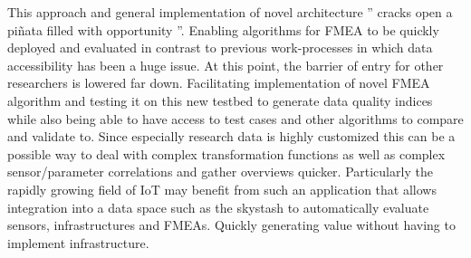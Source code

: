 This approach and general implementation of novel architecture '' cracks open a piñata filled with opportunity ''.\cite{zacharias_what_2023} Enabling algorithms for FMEA to be quickly deployed and evaluated in contrast to previous work-processes in which data accessibility has been a huge issue. At this point, the barrier of entry for other researchers is lowered far down. Facilitating implementation of novel FMEA algorithm and testing it on this new testbed to generate data quality indices while also being able to have access to test cases and other algorithms to compare and validate to. Since especially research data is highly customized this can be a possible way to deal with complex transformation functions as well as complex sensor/parameter correlations and gather overviews quicker. Particularly the rapidly growing field of IoT may benefit from such an application that allows integration into a data space such as the skystash to automatically evaluate sensors, infrastructures and FMEAs. Quickly generating value without having to implement infrastructure.







